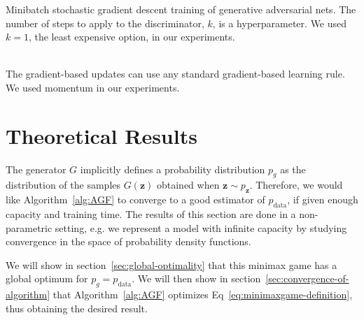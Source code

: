 \documentclass{article}
\begin{document}
\begin{algorithm}[ht]
\caption{\small Minibatch stochastic gradient descent training of generative adversarial nets.
The number of steps to apply to the discriminator, $k$, is a hyperparameter. We used $k=1$, the
least expensive option, in our experiments.
}
\begin{algorithmic}
\label{alg:AGF}
    
   
   
   
   
   \ENDFOR
  \ENDFOR
  \\The gradient-based updates can use any standard gradient-based learning rule. We used momentum in our experiments.
\end{algorithmic}
\end{algorithm}

\section{Theoretical Results}
\label{sec:theory}

The generator $G$ implicitly defines a probability distribution $p_g$ as
the distribution of the samples $G(\bm{z})$ obtained when $\bm{z} \sim
p_{\bm{z}}$. Therefore, we would like Algorithm~\ref{alg:AGF} to converge to a
good estimator of $p_\text{data}$, if given enough capacity and training time. The
results of this section are done in a non-parametric setting, e.g. we represent a
model with infinite capacity by studying convergence in the space of probability
density functions.

We will show in section~\ref{sec:global-optimality} that this minimax game
has a global optimum for $p_g = p_\text{data}$. We will then show in
section~\ref{sec:convergence-of-algorithm} that Algorithm~\ref{alg:AGF}
optimizes Eq~\ref{eq:minimaxgame-definition}, thus obtaining the desired
result.
\end{document}
